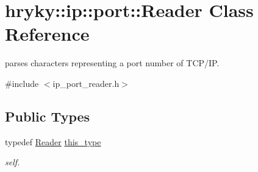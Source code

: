 \hypertarget{classhryky_1_1ip_1_1port_1_1_reader}{\section{hryky\-:\-:ip\-:\-:port\-:\-:Reader Class Reference}
\label{classhryky_1_1ip_1_1port_1_1_reader}
}


parses characters representing a port number of T\-C\-P/\-I\-P.  




{\ttfamily \#include $<$ip\-\_\-port\-\_\-reader.\-h$>$}

\subsection*{Public Types}
\begin{DoxyCompactItemize}
\item 
\hypertarget{classhryky_1_1ip_1_1port_1_1_reader_a5ed0fa6cde14d55890bca881ddacbd24}{typedef \hyperlink{classhryky_1_1ip_1_1port_1_1_reader}{Reader} \hyperlink{classhryky_1_1ip_1_1port_1_1_reader_a5ed0fa6cde14d55890bca881ddacbd24}{this\-\_\-type}}\label{classhryky_1_1ip_1_1port_1_1_reader_a5ed0fa6cde14d55890bca881ddacbd24}

\begin{DoxyCompactList}\small\item\em self. \end{DoxyCompactList}\end{DoxyCompactItemize}
